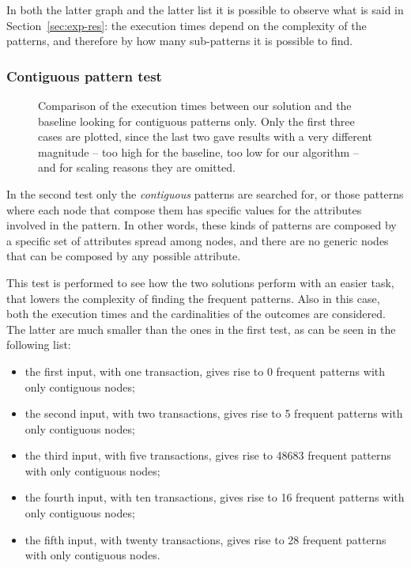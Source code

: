 \documentclass{acm_proc_article-sp-sigmod09}
\begin{document}
In both the latter graph and the latter list it is possible to observe what is said in Section~\ref{sec:exp-res}: the execution times depend on the complexity of the patterns, and therefore by how many sub-patterns it is possible to find.

\subsubsection{Contiguous pattern test}

\begin{figure}
\centering
{}
\caption{Comparison of the execution times between our solution and the baseline looking for contiguous patterns only. Only the first three cases are plotted, since the last two gave results with a very different magnitude -- too high for the baseline, too low for our algorithm -- and for scaling reasons they are omitted.}
\label{fig:testtwo}
\end{figure}

In the second test only the \emph{contiguous} patterns are searched for, or those patterns where each node that compose them has specific values for the attributes involved in the pattern. In other words, these kinds of patterns are composed by a specific set of attributes spread among nodes, and there are no generic nodes that can be composed by any possible attribute.

This test is performed to see how the two solutions perform with an easier task, that lowers the complexity of finding the frequent patterns. Also in this case, both the execution times and the cardinalities of the outcomes are considered. The latter are much smaller than the ones in the first test, as can be seen in the following list:
\begin{itemize}
\item the first input, with one transaction, gives rise to 0 frequent patterns with only contiguous nodes;
\item the second input, with two transactions, gives rise to 5 frequent patterns with only contiguous nodes;
\item the third input, with five transactions, gives rise to 48683 frequent patterns with only contiguous nodes;
\item the fourth input, with ten transactions, gives rise to 16 frequent patterns with only contiguous nodes;
\item the fifth input, with twenty transactions, gives rise to 28 frequent patterns with only contiguous nodes.
\end{itemize}
\end{document}

